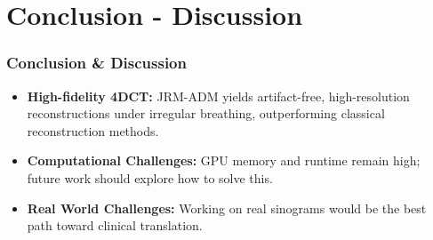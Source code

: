 \section{Conclusion - Discussion}


\begin{frame}[fragile]
  \frametitle{Conclusion \& Discussion}

  \begin{itemize}
    \item<1-> \textbf{High-fidelity 4DCT:} JRM-ADM yields artifact-free, high-resolution reconstructions under irregular breathing, outperforming classical reconstruction methods.
    \item<2-> \textbf{Computational Challenges:} GPU memory and runtime remain high; future work should explore how to solve this.
    \item<3-> \textbf{Real World Challenges:} Working on real sinograms would be the best path toward clinical translation.
  \end{itemize}
\end{frame}